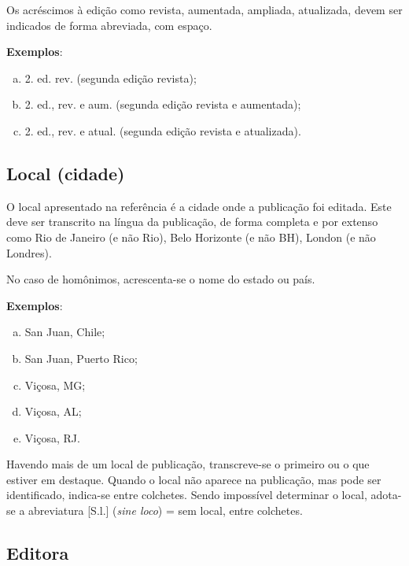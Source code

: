 Os acréscimos à edição como revista, aumentada, ampliada, atualizada, devem ser indicados de forma abreviada, com espaço.

\begin{exemplomanual}
\textbf{Exemplos}:

\begin{enumerate}[a)]
  \item  2. ed. rev. (segunda edição revista);
  \item  2. ed., rev. e aum. (segunda edição revista e aumentada);
  \item  2. ed., rev. e atual. (segunda edição revista e atualizada).
\end{enumerate}
\end{exemplomanual}


\subsection{Local (cidade)}

O local apresentado na referência é a cidade onde a publicação foi editada. Este deve ser transcrito na língua da publicação, de forma completa e por extenso como Rio de Janeiro (e não Rio), Belo Horizonte (e não BH), London (e não Londres).

No caso de homônimos, acrescenta-se o nome do estado ou país.

\begin{exemplomanual}
\textbf{Exemplos}:

\begin{enumerate}[a)]
  \item  San Juan, Chile;
  \item  San Juan, Puerto Rico;
  \item  Viçosa, MG;
  \item  Viçosa, AL;
  \item  Viçosa, RJ.
\end{enumerate}
\end{exemplomanual}

Havendo mais de um local de publicação, transcreve-se o primeiro ou o que estiver em destaque. Quando o local não aparece na publicação, mas pode ser identificado, indica-se entre colchetes. Sendo impossível determinar o local, adota-se a abreviatura [S.l.] (\textit{sine loco}) = sem local, entre colchetes.


\subsection{Editora}

